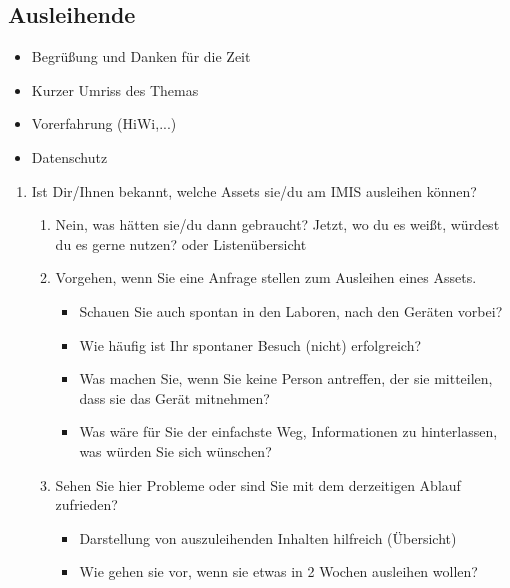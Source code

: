 \subsection{Ausleihende}
\begin{itemize}
    \item Begrüßung und Danken für die Zeit
    \item Kurzer Umriss des Themas
    \item Vorerfahrung (HiWi,...)
    \item Datenschutz
\end{itemize}

{\sffamily\color{maincolor}{Abschnitt: Jetzt}}
\begin{enumerate}
    \item Ist Dir/Ihnen bekannt, welche Assets sie/du am IMIS ausleihen können?
          \begin{enumerate}
              \item Nein, was hätten sie/du dann gebraucht? Jetzt, wo du es weißt, würdest du es gerne
                    nutzen? oder Listenübersicht
              \item Vorgehen, wenn Sie eine Anfrage stellen zum Ausleihen eines Assets.
                    \begin{itemize}
                        \item Schauen Sie auch spontan in den Laboren, nach den Geräten vorbei?
                        \item Wie häufig ist Ihr spontaner Besuch (nicht) erfolgreich?
                        \item Was machen Sie, wenn Sie keine Person antreffen, der sie mitteilen, dass sie das Gerät mitnehmen?
                        \item Was wäre für Sie der einfachste Weg, Informationen zu hinterlassen, was würden Sie sich wünschen?
                    \end{itemize}
              \item Sehen Sie hier Probleme oder sind Sie mit dem derzeitigen Ablauf zufrieden?
                    \begin{itemize}
                        \item Darstellung von auszuleihenden Inhalten hilfreich (Übersicht)
                        \item Wie gehen sie vor, wenn sie etwas in 2 Wochen ausleihen wollen?
                    \end{itemize}
          \end{enumerate}
\end{enumerate}

